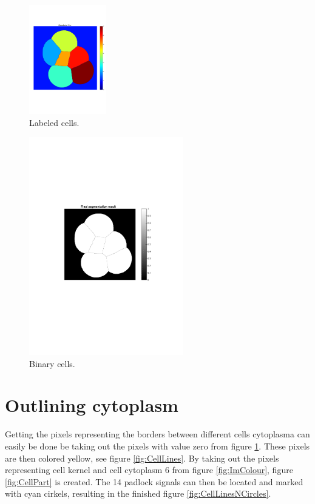 \documentclass[10pt,twocolumn]{article}
\begin{document}
\begin{figure}[ht]
\centering
\includegraphics[width=0.3\textwidth]{Bilder/CellBwLabeld.pdf}
\caption{Labeled cells.}
\label{fig:CellLabeled}
\end{figure}

\begin{figure}[ht]
\centering
\includegraphics[width=0.6\textwidth]{Bilder/CellBw.pdf}
\caption{Binary cells.}
\label{fig:CellBw}
\end{figure}

\section{Outlining cytoplasm}
Getting the pixels representing the borders between different cells cytoplasma can
easily be done be taking out the pixels with value zero from figure \ref{fig:CellLabeled}.
These pixels are then colored yellow, see figure \ref{fig:CellLines}.
By taking out the pixels representing cell kernel and cell cytoplasm 6 from figure
\ref{fig:ImColour}, figure \ref{fig:CellPart} is created. The 14 padlock signals can then be located and marked with cyan cirkels, resulting in the finished figure \ref{fig:CellLinesNCircles}.
\end{document}
